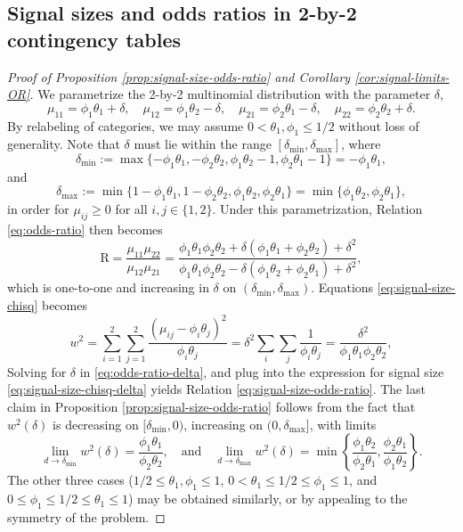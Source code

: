 \subsection{Signal sizes and odds ratios in 2-by-2 contingency tables}
\label{subsec:proof-signal-size-odds-ratio}

\begin{proof}[Proof of Proposition \ref{prop:signal-size-odds-ratio} and Corollary \ref{cor:signal-limits-OR}]
We parametrize the 2-by-2 multinomial distribution with the parameter $\delta$, 
\begin{equation} \label{eq:reparametrize-2-by-2-table-1}
    \mu_{11} = \phi_1\theta_1+\delta,\quad 
    \mu_{12} = \phi_1\theta_2-\delta,\quad 
    \mu_{21} = \phi_2\theta_1-\delta,\quad 
    \mu_{22} = \phi_2\theta_2+\delta.
\end{equation}
By relabeling of categories, we may assume $0<\theta_1,\phi_1\le1/2$ without loss of generality.
Note that $\delta$ must lie within the range $[\delta_\mathrm{min}, \delta_\mathrm{max}]$, where
$$
\delta_\mathrm{min} := \max\{-\phi_1\theta_1, -\phi_2\theta_2, \phi_1\theta_2-1, \phi_2\theta_1-1\} 
= -\phi_1\theta_1,
$$
and
$$
\delta_\mathrm{max} := \min\{1-\phi_1\theta_1, 1-\phi_2\theta_2, \phi_1\theta_2, \phi_2\theta_1\}
= \min\{\phi_1\theta_2, \phi_2\theta_1\},
$$
in order for $\mu_{ij}\ge0$ for all $i,j\in \{1,2\}$.
Under this parametrization, Relation \eqref{eq:odds-ratio} then becomes
\begin{equation} \label{eq:odds-ratio-delta}
    \text{R} = \frac{\mu_{11}\mu_{22}}{\mu_{12}\mu_{21}}
    = \frac{\phi_1\theta_1\phi_2\theta_2 + \delta(\phi_1\theta_1+\phi_2\theta_2)+\delta^2}{\phi_1\theta_1\phi_2\theta_2 - \delta(\phi_1\theta_2+\phi_2\theta_1)+\delta^2},
\end{equation}
which is one-to-one and increasing in $\delta$ on $(\delta_\mathrm{min}, \delta_\mathrm{max})$.
Equations \eqref{eq:signal-size-chisq} becomes
\begin{equation} \label{eq:signal-size-chisq-delta}
w^2 = \sum_{i=1}^2 \sum_{j=1}^2 \frac{(\mu_{ij} - \phi_i\theta_j)^2}{\phi_i\theta_j}
= \delta^2\sum_i\sum_j \frac{1}{\phi_i\theta_j}
= \frac{\delta^2}{\phi_1\theta_1\phi_2\theta_2},
\end{equation}
Solving for $\delta$ in \eqref{eq:odds-ratio-delta}, and plug into the expression for signal size \eqref{eq:signal-size-chisq-delta} yields Relation \eqref{eq:signal-size-odds-ratio}.
The last claim in Proposition \ref{prop:signal-size-odds-ratio} follows from the fact that $w^2(\delta)$ is decreasing on $[\delta_\mathrm{min},0)$, increasing on $(0,\delta_\mathrm{max}]$, with limits
$$
\lim_{d\to \delta_\mathrm{min}} w^2(\delta) = \frac{\phi_1\theta_1}{\phi_2\theta_2},
\quad
\text{and}
\quad
\lim_{d\to \delta_\mathrm{max}} w^2(\delta) = \min\left\{\frac{\phi_1\theta_2}{\phi_2\theta_1}, \frac{\phi_2\theta_1}{\phi_1\theta_2}\right\}.
$$
The other three cases ($1/2\le\theta_1,\phi_1\le1$, $0<\theta_1\le1/2\le\phi_1\le1$, and $0\le\phi_1\le1/2\le\theta_1\le1$) may be obtained similarly, or by appealing to the symmetry of the problem.
\end{proof}

